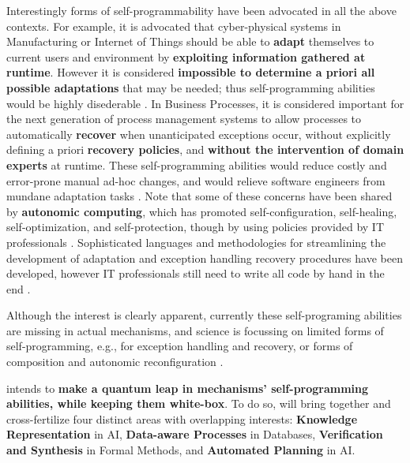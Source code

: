 Interestingly forms of self-programmability have been advocated in all
the above contexts.
For example, it is advocated that cyber-physical systems in
Manufacturing or Internet of Things should be able
to \textbf{adapt} themselves to current users and environment by
\textbf{exploiting information gathered at runtime}.  However it is
considered \textbf{impossible to determine a priori all possible adaptations}
that may be needed; thus self-programming abilities would be highly disederable
\cite{Seiger2016}.
In Business Processes, it is considered important for the next
generation of process management systems to allow processes to
automatically \textbf{recover} when unanticipated exceptions
occur, without explicitly defining a priori \textbf{recovery policies},
and \textbf{without the intervention of domain experts} at runtime. These
self-programming abilities would reduce costly and error-prone manual
ad-hoc changes, and would relieve software engineers from mundane
adaptation tasks \cite{MarrellaMS17}.
Note that some of these concerns have been shared by \textbf{autonomic
  computing}, which has promoted self-configuration, self-healing,
self-optimization, and self-protection, though by using policies
provided by IT professionals \cite{ibm2005autonomic}. 
Sophisticated languages and
methodologies for streamlining 
the development of
adaptation and exception
handling recovery procedures have been developed, however  IT
professionals still need to write
all code by hand in the end \cite{XXX}.




Although the interest is clearly apparent, currently these
self-programing abilities are missing in actual mechanisms, and
science is focussing on limited forms  of self-programming, e.g., for
exception handling and recovery, or forms of composition and 
autonomic reconfiguration \cite{???}.


\project intends to \textbf{make a quantum leap in
mechanisms' self-programming abilities, while keeping them white-box}. To do so,  \project will bring together and cross-fertilize four distinct areas with overlapping interests:
\textbf{Knowledge
  Representation} in AI, \textbf{Data-aware Processes} in Databases,  \textbf{Verification and Synthesis} in
Formal Methods, and  \textbf{Automated Planning} in AI. 

